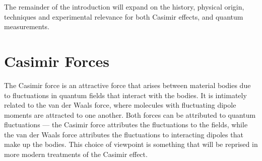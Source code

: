 The remainder of the introduction will expand on the history, physical origin, techniques and experimental 
relevance for both Casimir effects, and quantum measurements.  



\section{Casimir Forces}%

The Casimir force is an attractive force that arises between material bodies due to fluctuations in quantum fields
that interact with the bodies.  It is intimately related to the van der Waals force, where 
molecules with fluctuating dipole moments are attracted to one another.  Both forces can be attributed 
to quantum fluctuations --- the Casimir force attributes the fluctuations to the fields, while
the van der Waals force attributes the fluctuations to interacting dipoles that make up the bodies.  
This choice of viewpoint is something that will be reprised in more modern treatments of the Casimir effect.  


